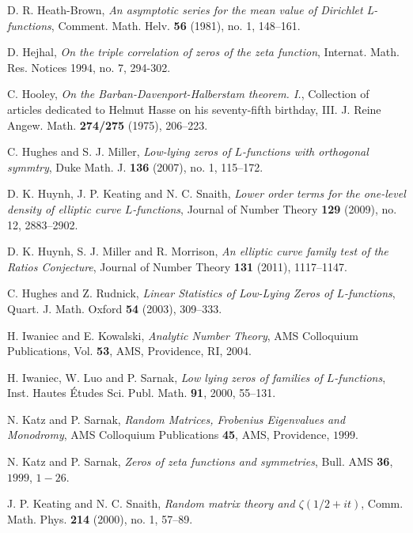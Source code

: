 \documentclass[12pt,reqno]{amsart}
\numberwithin{equation}{section}
\theoremstyle{plain}
\begin{document}
\begin{thebibliography}{GJMMNPPV}
D. R. Heath-Brown, \emph{An asymptotic series for the mean value of Dirichlet L-functions}, Comment. Math. Helv. \textbf{56} (1981), no. 1, 148--161.

\newblock D. Hejhal, \emph{On the triple correlation of zeros of
the zeta function}, Internat. Math. Res. Notices 1994, no. 7,
294-302.

 C. Hooley, \emph{On the Barban-Davenport-Halberstam theorem. I.}, Collection of articles dedicated to Helmut Hasse on his seventy-fifth birthday, III. J. Reine Angew. Math. \textbf{274/275} (1975), 206--223.

\newblock C. Hughes and S. J. Miller, \emph{Low-lying zeros of $L$-functions
with orthogonal symmtry}, Duke Math. J. \textbf{136}
(2007), no. 1, 115--172.

\newblock D. K. Huynh, J. P. Keating and N. C. Snaith, \emph{Lower order terms for the
one-level density of elliptic curve $L$-functions}, Journal of Number Theory \textbf{129} (2009),
no. 12, 2883--2902.

D. K. Huynh, S. J. Miller and R. Morrison, \emph{An elliptic curve family test of the Ratios Conjecture}, Journal of Number Theory \textbf{131} (2011), 1117--1147.

\newblock C. Hughes and Z. Rudnick, \emph{Linear Statistics of
Low-Lying Zeros of $L$-functions},  Quart. J. Math. Oxford
\textbf{54} (2003), 309--333.

H. Iwaniec and E. Kowalski, \emph{Analytic Number Theory}, AMS
Colloquium Publications, Vol.
\textbf{53}, AMS, Providence, RI, 2004.

\newblock H. Iwaniec, W. Luo and P. Sarnak, \emph{Low lying zeros of
families of $L$-functions}, Inst. Hautes \'Etudes Sci. Publ. Math.
\textbf{91}, 2000, 55--131.

\newblock N. Katz and P. Sarnak, \emph{Random Matrices, Frobenius
Eigenvalues and Monodromy}, AMS Colloquium Publications \textbf{45},
AMS, Providence, $1999$.

\newblock N. Katz and P. Sarnak, \emph{Zeros of zeta functions and symmetries},
Bull. AMS \textbf{36}, $1999$, $1-26$.

\newblock J. P. Keating and N. C. Snaith, \emph{Random matrix theory
and $\zeta(1/2+it)$},  Comm. Math. Phys.  \textbf{214} (2000),  no.
1, 57--89.


\end{thebibliography}
\end{document}
